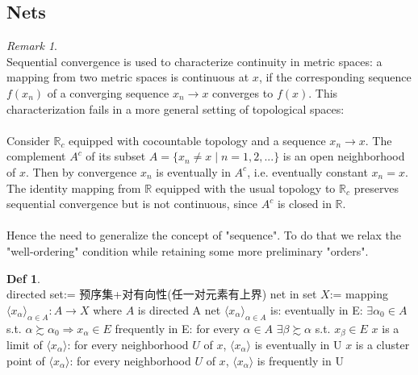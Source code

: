 \documentclass[hidelinks]{article}
\theoremstyle{definition}
\newtheorem*{defin}{Def}
\theoremstyle{plain}
\theoremstyle{remark}
\newtheorem*{remark}{Remark}
\begin{document}
\subsection{Nets}
\begin{remark}~\\
Sequential convergence is used to characterize continuity in metric spaces: a mapping from two metric spaces is continuous at $x$, if the corresponding sequence $f(x_n)$ of a converging sequence $x_n\to x$ converges to $f(x)$. This characterization fails in a more general setting of topological spaces:\\
 \\
Consider $\mathbb{R}_c$ equipped with cocountable topology and a sequence $x_n\to x$. The complement $A^c$ of its subset $A=\{x_n\neq x\mid n=1,2,...\}$ is an open neighborhood of $x$. Then by convergence $x_n$ is eventually in $A^c$, i.e. eventually constant $x_n=x$. The identity mapping from $\mathbb{R}$ equipped with the usual topology to $\mathbb{R}_c$ preserves sequential convergence but is not continuous, since $A^c$ is closed in $\mathbb{R}$. \\
 \\
Hence the need to generalize the concept of "sequence". To do that we relax the "well-ordering" condition while retaining some more preliminary "orders". 
\end{remark}

\begin{defin}~\\
directed set:= 预序集+对有向性(任一对元素有上界) \newline
net in set $X$:=  mapping $\langle x_\alpha\rangle_{\alpha \in A}:A\to X$ where $A$ is directed \newline
A net $\langle x_\alpha\rangle_{\alpha \in A}$ is: \newline
\indent eventually in E: $\exists \alpha_0 \in A$ s.t. $\alpha \succsim \alpha_0 \Rightarrow x_\alpha \in E$ \newline
\indent frequently in E: for every $\alpha \in A$ $\exists \beta \succsim \alpha$ s.t. $x_\beta \in E$ \newline
\indent $x$ is a limit of $\langle x_\alpha\rangle$: for every neighborhood $U$ of $x$, $\langle x_\alpha\rangle$ is eventually in U \newline
\indent $x$ is a cluster point of $\langle x_\alpha\rangle$: for every neighborhood $U$ of $x$, $\langle x_\alpha\rangle$ is frequently in U
\end{defin}
\end{document}
